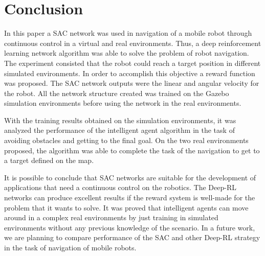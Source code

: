 \section{Conclusion}

In this paper a SAC network was used in navigation of a mobile robot through continuous control in a virtual and real environments.
Thus, a deep reinforcement learning network algorithm was able to solve the problem of robot navigation.
The experiment consisted that the robot could reach a target position in different simulated environments.
In order to accomplish this objective a reward function was proposed. The SAC network outputs were the linear and angular velocity for the robot.
All the network structure created was trained on the Gazebo simulation environments before using the network in the real environments.

With the training results obtained on the simulation environments, it was analyzed the performance of the intelligent agent algorithm in the task of avoiding obstacles and getting to the final goal. 
On the two real environments proposed, the algorithm was able to complete the task of the navigation to get to a target defined on the map.

It is possible to conclude that SAC networks are suitable for the development of applications that need a continuous control on the robotics.
The Deep-RL networks can produce excellent results if the reward system is well-made for the problem that it wants to solve.
It was proved that intelligent agents can move around in a complex real environments by just training in simulated environments without any previous knowledge of the scenario.
In a future work, we are planning to compare performance of the SAC and other Deep-RL strategy in the task of navigation of mobile robots.